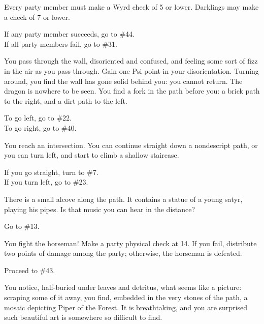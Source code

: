 \documentclass[green]{gl2018}
\begin{document}
\begin{large}
\begin{location}{27}
Every party member must make a Wyrd check of 5 or lower.  Darklings may make a check of 7 or lower. 
\begin{fromhere}
If any party member succeeds, go to \#44.\\
 If all party members fail, go to \#31.
\end{fromhere}
\end{location}
\begin{location}{28}
You pass through the wall, disoriented and confused, and feeling some sort of fizz in the air as you pass through.  Gain one Psi point in your disorientation.  Turning around, you find the wall has gone solid behind you: you cannot return.  The dragon is nowhere to be seen.  You find a fork in the path before you: a brick path to the right, and a dirt path to the left.  
\begin{fromhere}To go left, go to \#22.\\  To go right, go to \#40.\end{fromhere}
\end{location}
\begin{location}{29}
You reach an intersection. You can continue straight down a nondescript path, or you can turn left, and start to climb a shallow staircase.  
\begin{fromhere}If you go straight, turn to \#7.\\ If you turn left, go to \#23.\end{fromhere}
\end{location}
\begin{location}{30}
There is a small alcove along the path. It contains a statue of a young satyr, playing his pipes. Is that music you can hear in the distance? 
\begin{fromhere}Go to \#13.\end{fromhere}
\end{location}
\begin{location}{31}
You fight the horseman!  Make a party physical check at 14.  If you fail, distribute two points of damage among the party; otherwise, the horseman is defeated.
\begin{fromhere}
Proceed to \#43.
\end{fromhere}
\end{location}
\begin{location}{32}
You notice, half-buried under leaves and detritus, what seems like a picture: scraping some of it away, you find, embedded in the very stones of the path, a mosaic depicting Piper of the Forest.  It is breathtaking, and you are surprised such beautiful art is somewhere so difficult to find.

\end{location}
\end{large}
\end{document}
